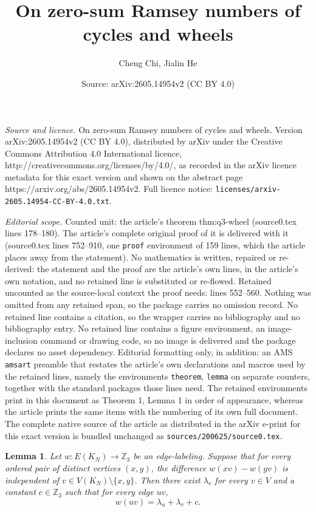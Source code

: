 \documentclass[10pt,a4paper]{amsart}
\title{On zero-sum Ramsey numbers of cycles and wheels}
\author{Cheng Chi, Jialin He}
\date{Source: arXiv:2605.14954v2 (CC BY 4.0)}
\newtheorem{lemma}{Lemma}
\newcommand{\Z}{\mathbb Z}
\begin{document}
\maketitle

\noindent\emph{Source and licence.} On zero-sum Ramsey numbers of cycles and wheels. Version arXiv:2605.14954v2 (CC BY 4.0), distributed by arXiv under the Creative Commons Attribution 4.0 International licence, http://creativecommons.org/licenses/by/4.0/, as recorded in the arXiv licence metadata for this exact version and shown on the abstract page https://arxiv.org/abs/2605.14954v2. Full licence notice: \texttt{licenses/arxiv-2605.14954-CC-BY-4.0.txt}.\par\smallskip

\noindent\textit{Editorial scope.} Counted unit: the article's theorem thm:q3-wheel (source0.tex lines 178--180). The article's complete original proof of it is delivered with it (source0.tex lines 752--910, one \texttt{proof} environment of 159 lines, which the article places away from the statement). No mathematics is written, repaired or re-derived: the statement and the proof are the article's own lines, in the article's own notation, and no retained line is substituted or re-flowed.  Retained uncounted as the source-local context the proof needs: lines 552--560.  Nothing was omitted from any retained span, so the package carries no omission record.  No retained line contains a citation, so the wrapper carries no bibliography and no bibliography entry.  No retained line contains a figure environment, an image-inclusion command or drawing code, so no image is delivered and the package declares no asset dependency.  Editorial formatting only, in addition: an AMS \texttt{amsart} preamble that restates the article's own declarations and macros used by the retained lines, namely the environments \texttt{theorem}, \texttt{lemma} on separate counters, together with the standard packages those lines need.  The retained environments print in this document as Theorem 1, Lemma 1 in order of appearance, whereas the article prints the same items with the numbering of its own full document.  The complete native source of the article as distributed in the arXiv e-print for this exact version is bundled unchanged as \texttt{sources/200625/source0.tex}.
\begin{lemma}\label{lem:z3-affine}
    Let $w\colon E(K_N)\to \Z_3$ be an edge-labeling.  Suppose that for every ordered pair of distinct vertices $(x,y)$, the difference
    $w(xv)-w(yv)$
    is independent of $v\in V(K_N)\setminus\{x,y\}$.
    Then there exist $\lambda_v$ for every $v\in V$ and a constant $c\in\Z_3$ such that for every edge $uv$,
    \[
        w(uv)=\lambda_u+\lambda_v+c.
    \]
\end{lemma}
\end{document}

